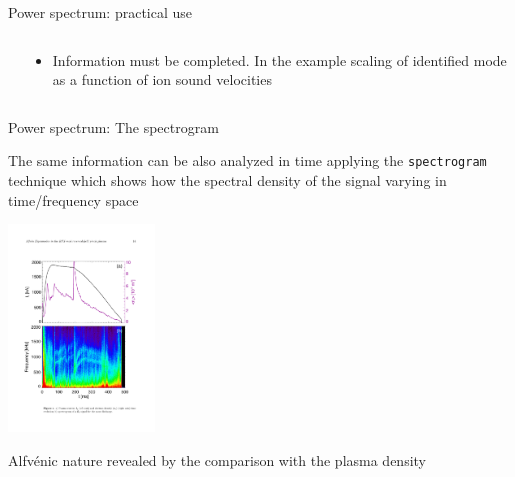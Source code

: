 \documentclass[t,10pt]{beamer}
\begin{document}
\begin{frame}{Power spectrum: practical use}
{\begin{columns}[c]
\begin{column}{0.6\textwidth}
\end{column}
\begin{column}{0.4\textwidth}
{\small \begin{itemize}
\item Information must be completed. In the example scaling of identified mode as a function of
  ion sound velocities
\end{itemize}}
\end{column}
\end{columns}
}\end{frame}

\begin{frame}{Power spectrum: The spectrogram}
\begin{itemize}
{\footnotesize \item The same information can be also analyzed in time applying the
  \textcolor{tascarletred}{\texttt{spectrogram}} technique which shows
  how the spectral density of the signal varying in time/frequency
  space {\footnotesize \parencite{spagnolo}}
}

\begin{center}
\includegraphics[height=5.5cm]{alfven} 
\end{center}
{\footnotesize\item Alfv\'enic nature revealed by the
  comparison with the plasma density
}\end{itemize}
\end{frame}
\end{document}
